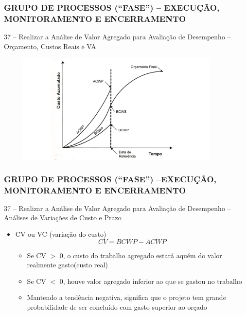 \begin{frame}
 \frametitle{GRUPO DE PROCESSOS (“FASE”) – \small{EXECUÇÃO, MONITORAMENTO E ENCERRAMENTO}}
 37 – Realizar a Análise de Valor Agregado para Avaliação de Desempenho – Orçamento, Custos Reais e VA
   \begin{figure}
   \centering
   \includegraphics[width = 0.9\textwidth]{figs/fig6.png}
  \end{figure}
\end{frame}

\begin{frame}
 \frametitle{GRUPO DE PROCESSOS (“FASE”) –\small{EXECUÇÃO, MONITORAMENTO E ENCERRAMENTO}}
37 – Realizar a Análise de Valor Agregado para Avaliação de Desempenho – Análises de Variações de Custo e Prazo
\begin{itemize}
 \item CV ou VC (variação do custo)
 \begin{equation}
  CV = BCWP - ACWP
 \end{equation}
 \begin{itemize}
  \item Se CV $>$ 0, o custo do trabalho agregado estará aquém do valor realmente gasto(custo real)
  \item Se CV $<$ 0, houve valor agregado inferior ao que se gastou no trabalho
  \item Mantendo a tendência negativa, significa que o projeto tem grande probabilidade de ser concluído com gasto superior ao orçado
 \end{itemize}
 \end{itemize}
\end{frame}

